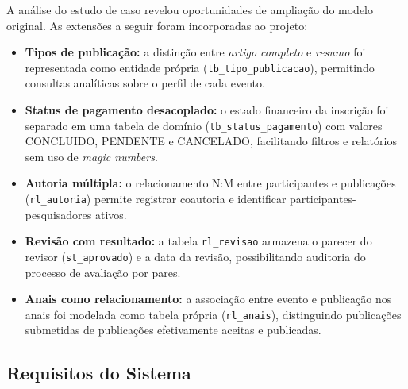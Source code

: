 \documentclass[12pt]{article}
\begin{document}
A análise do estudo de caso revelou oportunidades de ampliação do modelo original. As extensões a seguir foram incorporadas ao projeto:

\begin{itemize}
    \item \textbf{Tipos de publicação:} a distinção entre \emph{artigo completo}
    e \emph{resumo} foi representada como entidade própria (\texttt{tb\_tipo\_publicacao}),
    permitindo consultas analíticas sobre o perfil de cada evento.

    \item \textbf{Status de pagamento desacoplado:} o estado financeiro da inscrição
    foi separado em uma tabela de domínio (\texttt{tb\_status\_pagamento}) com valores
    CONCLUIDO, PENDENTE e CANCELADO, facilitando filtros e relatórios sem uso de
    \emph{magic numbers}.

    \item \textbf{Autoria múltipla:} o relacionamento N:M entre participantes e
    publicações (\texttt{rl\_autoria}) permite registrar coautoria e identificar
    participantes-pesquisadores ativos.

    \item \textbf{Revisão com resultado:} a tabela \texttt{rl\_revisao} armazena o
    parecer do revisor (\texttt{st\_aprovado}) e a data da revisão, possibilitando
    auditoria do processo de avaliação por pares.

    \item \textbf{Anais como relacionamento:} a associação entre evento e publicação
    nos anais foi modelada como tabela própria (\texttt{rl\_anais}), distinguindo
    publicações submetidas de publicações efetivamente aceitas e publicadas.
\end{itemize}

\subsection{Requisitos do Sistema}
\label{subsec:requisitos}
\end{document}
